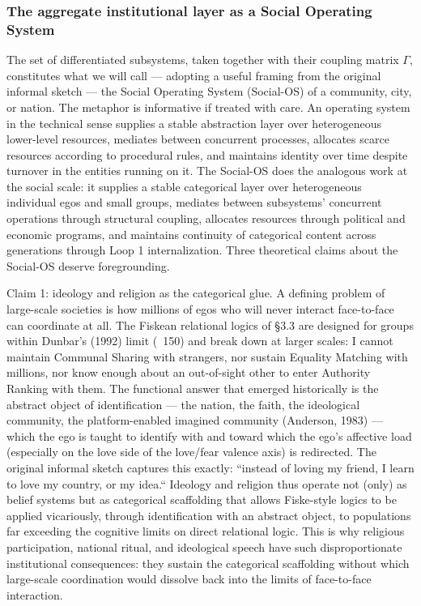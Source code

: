 \documentclass[12pt,a4paper]{article}
\begin{document}
\subsubsection{The aggregate institutional layer as a Social Operating System}

The set of differentiated subsystems, taken together with their coupling matrix $\Gamma$, constitutes what we will call --- adopting a useful framing from the original informal sketch --- the Social Operating System (Social-OS) of a community, city, or nation. The metaphor is informative if treated with care. An operating system in the technical sense supplies a stable abstraction layer over heterogeneous lower-level resources, mediates between concurrent processes, allocates scarce resources according to procedural rules, and maintains identity over time despite turnover in the entities running on it. The Social-OS does the analogous work at the social scale: it supplies a stable categorical layer over heterogeneous individual egos and small groups, mediates between subsystems' concurrent operations through structural coupling, allocates resources through political and economic programs, and maintains continuity of categorical content across generations through Loop 1 internalization. Three theoretical claims about the Social-OS deserve foregrounding.


Claim 1: ideology and religion as the categorical glue. A defining problem of large-scale societies is how millions of egos who will never interact face-to-face can coordinate at all. The Fiskean relational logics of §3.3 are designed for groups within Dunbar's (1992) limit (~150) and break down at larger scales: I cannot maintain Communal Sharing with strangers, nor sustain Equality Matching with millions, nor know enough about an out-of-sight other to enter Authority Ranking with them. The functional answer that emerged historically is the abstract object of identification --- the nation, the faith, the ideological community, the platform-enabled imagined community (Anderson, 1983) --- which the ego is taught to identify with and toward which the ego's affective load (especially on the love side of the love/fear valence axis) is redirected. The original informal sketch captures this exactly: ``instead of loving my friend, I learn to love my country, or my idea.`` Ideology and religion thus operate not (only) as belief systems but as categorical scaffolding that allows Fiske-style logics to be applied vicariously, through identification with an abstract object, to populations far exceeding the cognitive limits on direct relational logic. This is why religious participation, national ritual, and ideological speech have such disproportionate institutional consequences: they sustain the categorical scaffolding without which large-scale coordination would dissolve back into the limits of face-to-face interaction.
\end{document}

